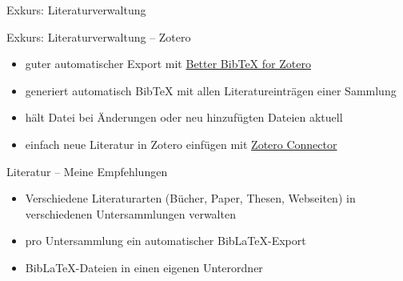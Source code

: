 \documentclass[presentation,aspectratio=169]{beamer}
\begin{document}
\begin{frame}{Exkurs: Literaturverwaltung}
\end{frame}

\begin{frame}{Exkurs: Literaturverwaltung -- Zotero}
  \begin{itemize}
    \item guter automatischer Export mit \href{https://retorque.re/zotero-better-bibtex/}{Better Bib\TeX{} for Zotero}
    \item generiert automatisch Bib\TeX{} mit allen Literatureinträgen einer Sammlung
    \item hält Datei bei Änderungen oder neu hinzufügten Dateien aktuell
      \bigskip
    \item einfach neue Literatur in Zotero einfügen mit \href{https://www.zotero.org/download/}{Zotero Connector}
  \end{itemize}
\end{frame}

\begin{frame}{Literatur -- Meine Empfehlungen}
  \begin{itemize}
    \item Verschiedene Literaturarten (Bücher, Paper, Thesen, Webseiten) in verschiedenen Untersammlungen verwalten
    \item pro Untersammlung ein automatischer Bib\LaTeX{}-Export
    \item Bib\LaTeX{}-Dateien in einen eigenen Unterordner
  \end{itemize}
\end{frame}
\end{document}
